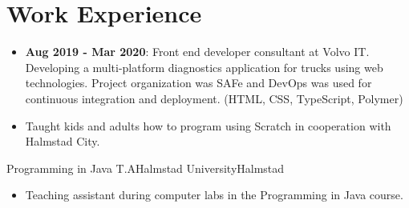 \documentclass[11pt,a4paper,sans,colorlinks,linkcolor=blue,urlcolor=blue]{moderncv}
\begin{document}
\makecvtitle
\setlength{\parskip}{0.15em}
\vspace{-40.0pt}

\section{Work Experience}
{\begin{itemize}
    \itemsep0.3em
    \setlength{\itemindent}{.25in}
    \item \textbf{Aug 2019 - Mar 2020}: Front end developer consultant at Volvo IT. Developing a multi-platform diagnostics application for trucks using web technologies. Project organization was SAFe and DevOps was used for continuous integration and deployment. (HTML, CSS, TypeScript, Polymer)
\end{itemize}}

{\begin{itemize}
    \itemsep0.3em
    \setlength{\itemindent}{.25in}
    \item Taught kids and adults how to program using Scratch in cooperation with Halmstad City.
\end{itemize}}

{Programming in Java T.A}{Halmstad University}{Halmstad}{}
{\begin{itemize}
    \itemsep0.3em
    \setlength{\itemindent}{.25in}
    \item Teaching assistant during computer labs in the Programming in Java course.
\end{itemize}}

\end{document}
